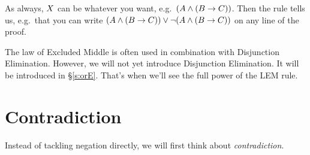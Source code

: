 As always, $X$ can be whatever you want, e.g.~$(A\mathbin{\wedge}(B\rightarrow C))$. Then the rule tells us, e.g.~that you can write $(A\mathbin{\wedge}(B\rightarrow C))\vee\neg(A\mathbin{\wedge}(B\rightarrow C))$ on any line of the proof.


The law of Excluded Middle is often used in combination with Disjunction Elimination. 
However, we will not yet introduce Disjunction Elimination. It will be introduced in \S\ref{s:orE}. That's when we'll see the full power of the LEM rule. 


%
%
%
%
%



\section{Contradiction}
Instead of tackling negation directly, we will first think about \emph{contradiction}. 


